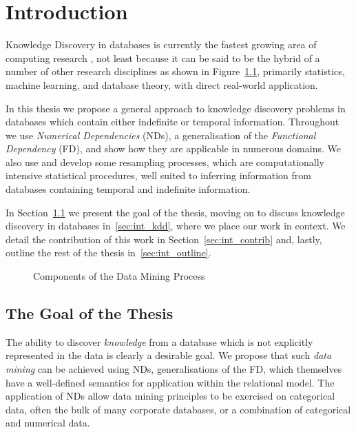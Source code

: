 \chapter{Introduction}\label{chap:intro}

Knowledge Discovery in databases is currently the fastest
growing area of computing research \cite{knowdisc91}, not least because it can be said
to be the hybrid of a number of other research disciplines as shown in
Figure~\ref{fig:dm_process}, primarily statistics, machine learning,
and database theory, with direct real-world application.

\medskip

In this thesis we propose a general approach to
knowledge discovery
problems in databases which contain either indefinite or temporal
information. Throughout we use {\em Numerical Dependencies} (NDs), a
generalisation of the {\em Functional Dependency} (FD), and  
show how they are applicable in numerous domains.  We also use and develop some
resampling processes, which are computationally intensive statistical  
procedures, well suited to inferring information from  
databases containing temporal and indefinite information.  

In Section~\ref{sec:int_hyp} we present the goal of the thesis, moving
on to discuss knowledge discovery in databases 
in~\ref{sec:int_kdd}, where we place our work in context. We detail
the contribution of this work in 
Section~\ref{sec:int_contrib} and, lastly, outline the rest of the
thesis in~\ref{sec:int_outline}.

\begin{figure}
\centerline{}
\caption{\label{fig:dm_process}Components of the Data
Mining Process}
\end{figure}

\section{The Goal of the Thesis}\label{sec:int_hyp}

The ability to discover {\em knowledge} from a database which is not
explicitly represented in the data is clearly a desirable goal. We
propose that such {\em data mining} can be achieved using NDs,
generalisations of the FD, 
which themselves have a well-defined semantics for application within
the relational model. The application of NDs allow data
mining principles to be exercised on categorical data, often the bulk
of many corporate databases, or a combination of categorical and
numerical data. 

